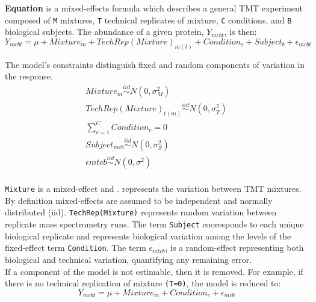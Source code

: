 \documentclass[11pt]{elife}\usepackage[]{graphicx}\usepackage[]{color}
\begin{document}
\textbf{Equation} is a mixed-effects formula which describes a general TMT
experiment composed of \texttt{M} mixtures, \texttt{T} technical replicates of 
mixture, \texttt{C} conditions, and \texttt{B} biological subjects.
The abundance of a given protein, $Y_{mcbt}$, is then:\\

\begin{equation}
	Y_{mcbt} = \mu + Mixture_m + TechRep(Mixture)_{m(t)} + Condition_c + 
	Subject_b + \epsilon_{mcbt}
\end{equation}

The model's constraints distinguish fixed and random components of 
variation in the response.\\

\begin{equation}
  \begin{gathered}
	Mixture_m \stackrel{iid}{\sim} N(0,\sigma^2_M) \\
	TechRep(Mixture)_{t(m)} \stackrel{iid}{\sim} N(0,\sigma^2_T) \\
	\sum_{c=1}^{C} Condition_c = 0 \\
	Subject_{mcb} \stackrel{iid}{\sim} N(0,\sigma^2_S) \\
	\epsilon{mtcb} \stackrel{iid}{\sim} N(0,\sigma^2) \\
  \end{gathered}
\end{equation}

\texttt{Mixture} is a mixed-effect and .
represents the variation between TMT mixtures. By definition mixed-effects are 
assumed to be independent and normally distributed (iid). 
\texttt{TechRep(Mixture)} represents random 
variation between replicate mass spectrometry runs.
The term \texttt{Subject} cooresponds to each unique biological replicate and 
represents biological variation among the levels of the fixed-effect term
\texttt{Condition}. The term $\epsilon_{mtcb}$,
is a random-effect representing both biological and technical variation, 
quantifying any remaining error.\\

If a component of the model is not estimable, then it is removed. 
For example, if there is no technical replication of mixture 
\texttt{(T=0)}, the model is reduced to: \\

\begin{equation} 
	Y_{mcbt} = \mu + Mixture_m + Condition_c + \epsilon_{mcb}
\end{equation}
\end{document}
